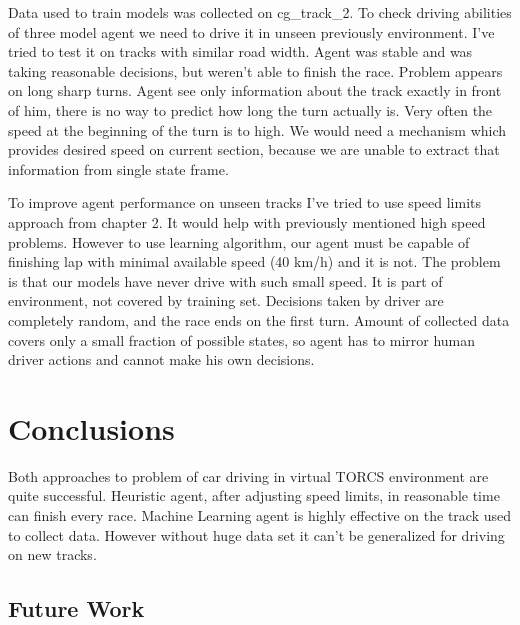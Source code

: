 \documentclass[declaration,shortabstract,english,inz]{iithesis}
\begin{document}
Data used to train models was collected on cg\_track\_2.
To check driving abilities of three model agent we need to drive it in unseen previously environment.
I've tried to test it on tracks with similar road width.
Agent was stable and was taking reasonable decisions, but weren't able to finish the race.
Problem appears on long sharp turns.
Agent see only information about the track exactly in front of him, there is no way to predict how long the turn actually is.
Very often the speed at the beginning of the turn is to high.
We would need a mechanism which provides desired speed on current section, because we are unable to extract that information from single state frame.

To improve agent performance on unseen tracks I've tried to use speed limits approach from chapter 2.
It would help with previously mentioned high speed problems.
However to use learning algorithm, our agent must be capable of finishing lap with minimal available speed (40 km/h) and it is not.
The problem is that our models have never drive with such small speed.
It is part of environment, not covered by training set.
Decisions taken by driver are completely random, and the race ends on the first turn.
Amount of collected data covers only a small fraction of possible states, so agent has to mirror human driver actions and cannot make his own decisions.


\chapter{Conclusions}


Both approaches to problem of car driving in virtual TORCS environment are quite successful.
Heuristic agent, after adjusting speed limits, in reasonable time can finish every race.
Machine Learning agent is highly effective on the track used to collect data.
However without huge data set it can't be generalized for driving on new tracks.


\section{Future Work}
\end{document}
